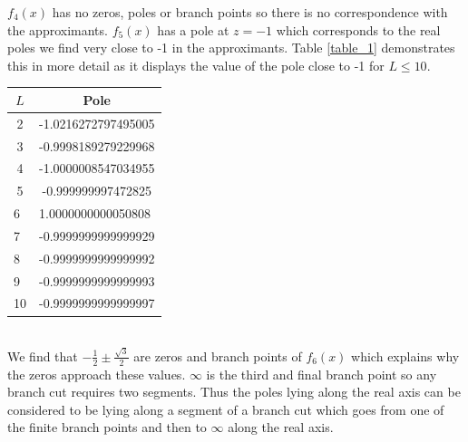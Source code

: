 \documentclass[12pt, a4paper]{article}
\begin{document}
\begin{minipage}{0.45\textwidth}
$f_{4}(x)$ has no zeros, poles or branch points so there is no correspondence with the approximants.
$f_{5}(x)$ has a pole at $z = -1$ which corresponds to the real poles we find very close to -1 in the
approximants. Table \ref{table_1} demonstrates this in more detail as it displays the value of the
pole close to -1 for $L \leq 10$.
\end{minipage}
\hspace{0.05\textwidth}
\begin{minipage}{0.49\textwidth}
	\centering
	\renewcommand{\arraystretch}{1.2}
	\begin{tabular}{|l|l|}
		\hline
		\multicolumn{1}{|c|}{$L$} & \multicolumn{1}{c|}{Pole}               \\ \hline
		\multicolumn{1}{|c|}{2}   & \multicolumn{1}{c|}{-1.0216272797495005} \\ \hline
		\multicolumn{1}{|c|}{3}   & \multicolumn{1}{c|}{-0.9998189279229968} \\ \hline
		\multicolumn{1}{|c|}{4}   & \multicolumn{1}{c|}{-1.0000008547034955} \\ \hline
		\multicolumn{1}{|c|}{5}   & \multicolumn{1}{c|}{-0.999999997472825}  \\ \hline
		6                         & 1.0000000000050808                       \\ \hline
		7                         & -0.9999999999999929                      \\ \hline
		8                         & -0.9999999999999992                      \\ \hline
		9                         & -0.9999999999999993                      \\ \hline
		10                        & -0.9999999999999997                      \\ \hline

	\end{tabular}
	\label{table_1}
\end{minipage}
\\

We find that $-\frac{1}{2} \pm \frac{\sqrt{3}}{2}$ are zeros and branch points of $f_{6}(x)$ which
explains why the zeros approach these values. $\infty$ is the third and final branch point so any branch
cut requires two segments. Thus the poles lying along the real axis can be considered to be lying along
a segment of a branch cut which goes from one of the finite branch points and then to $\infty$ along 
the real axis.
\\
\end{document}
